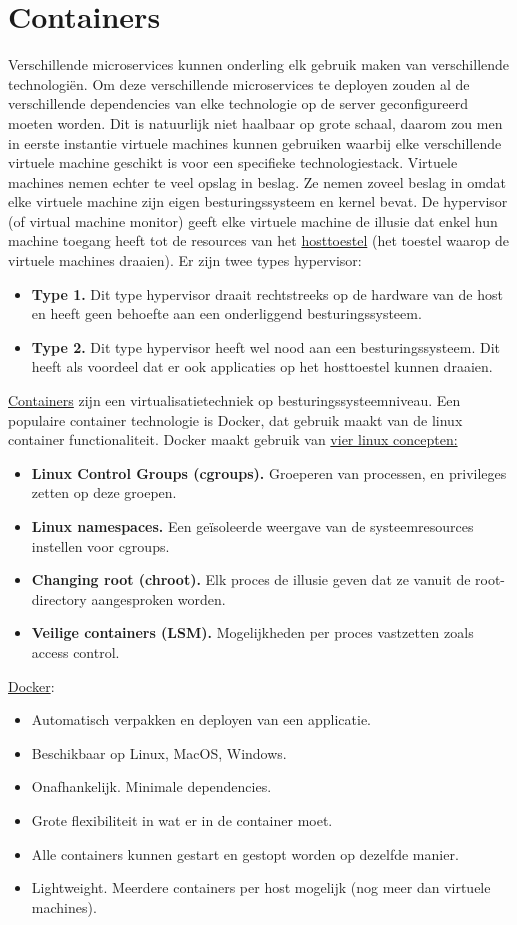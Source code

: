 	\chapter{Containers}
	Verschillende microservices kunnen onderling elk gebruik maken van verschillende technologiën. Om deze verschillende microservices te deployen zouden al de verschillende dependencies van elke technologie op de server geconfigureerd moeten worden. Dit is natuurlijk niet haalbaar op grote schaal, daarom zou men in eerste instantie virtuele machines kunnen gebruiken waarbij elke verschillende virtuele machine geschikt is voor een specifieke technologiestack. Virtuele machines nemen echter te veel opslag in beslag. Ze nemen zoveel beslag in omdat elke virtuele machine zijn eigen besturingssysteem en kernel bevat. De hypervisor (of virtual machine monitor) geeft elke virtuele machine de illusie dat enkel hun machine toegang heeft tot de resources van het \underline{hosttoestel} (het toestel waarop de virtuele machines draaien). 
	Er zijn twee types hypervisor:
	\begin{itemize}
		\item \textbf{Type 1.} Dit type hypervisor draait rechtstreeks op de hardware van de host en heeft geen behoefte aan een onderliggend besturingssysteem. 
		\item \textbf{Type 2.} Dit type hypervisor heeft wel nood aan een besturingssysteem. Dit heeft als voordeel dat er ook applicaties op het hosttoestel kunnen draaien.
	\end{itemize}
	\underline{Containers} zijn een virtualisatietechniek op besturingssysteemniveau. Een populaire container technologie is Docker, dat gebruik maakt van de linux container functionaliteit. Docker maakt gebruik van \uline{vier linux concepten:}
	\begin{itemize}
		\item \textbf{Linux Control Groups (cgroups).} Groeperen van processen, en privileges zetten op deze groepen.
		\item \textbf{Linux namespaces.} Een geïsoleerde weergave van de systeemresources instellen voor cgroups.
		\item \textbf{Changing root (chroot).} Elk proces de illusie geven dat ze vanuit de root-directory aangesproken worden.
		\item \textbf{Veilige containers (LSM).} Mogelijkheden per proces vastzetten zoals access control.
	\end{itemize}

	\underline{Docker}:
	\begin{itemize}
		\item Automatisch verpakken en deployen van een applicatie.
		\item Beschikbaar op Linux, MacOS, Windows.
		\item Onafhankelijk. Minimale dependencies.
		\item Grote flexibiliteit in wat er in de container moet.
		\item Alle containers kunnen gestart en gestopt worden op dezelfde manier.
		\item Lightweight. Meerdere containers per host mogelijk (nog meer dan virtuele machines).
	\end{itemize}

